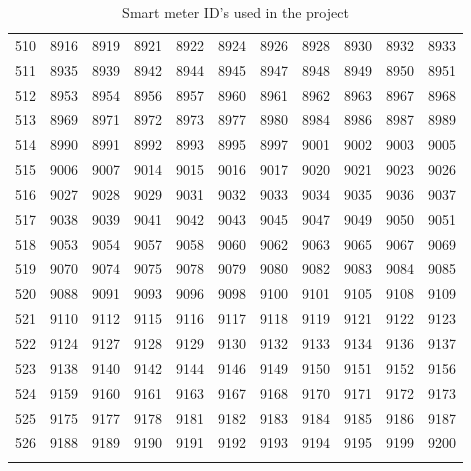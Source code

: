 \begin{longtable}{|r|rrrrrrrrrr|}
  510 & 8916 & 8919 & 8921 & 8922 & 8924 & 8926 & 8928 & 8930 & 8932 & 8933 \\ 
  511 & 8935 & 8939 & 8942 & 8944 & 8945 & 8947 & 8948 & 8949 & 8950 & 8951 \\ 
  512 & 8953 & 8954 & 8956 & 8957 & 8960 & 8961 & 8962 & 8963 & 8967 & 8968 \\ 
  513 & 8969 & 8971 & 8972 & 8973 & 8977 & 8980 & 8984 & 8986 & 8987 & 8989 \\ 
  514 & 8990 & 8991 & 8992 & 8993 & 8995 & 8997 & 9001 & 9002 & 9003 & 9005 \\ 
  515 & 9006 & 9007 & 9014 & 9015 & 9016 & 9017 & 9020 & 9021 & 9023 & 9026 \\ 
  516 & 9027 & 9028 & 9029 & 9031 & 9032 & 9033 & 9034 & 9035 & 9036 & 9037 \\ 
  517 & 9038 & 9039 & 9041 & 9042 & 9043 & 9045 & 9047 & 9049 & 9050 & 9051 \\ 
  518 & 9053 & 9054 & 9057 & 9058 & 9060 & 9062 & 9063 & 9065 & 9067 & 9069 \\ 
  519 & 9070 & 9074 & 9075 & 9078 & 9079 & 9080 & 9082 & 9083 & 9084 & 9085 \\ 
  520 & 9088 & 9091 & 9093 & 9096 & 9098 & 9100 & 9101 & 9105 & 9108 & 9109 \\ 
  521 & 9110 & 9112 & 9115 & 9116 & 9117 & 9118 & 9119 & 9121 & 9122 & 9123 \\ 
  522 & 9124 & 9127 & 9128 & 9129 & 9130 & 9132 & 9133 & 9134 & 9136 & 9137 \\ 
  523 & 9138 & 9140 & 9142 & 9144 & 9146 & 9149 & 9150 & 9151 & 9152 & 9156 \\ 
  524 & 9159 & 9160 & 9161 & 9163 & 9167 & 9168 & 9170 & 9171 & 9172 & 9173 \\ 
  525 & 9175 & 9177 & 9178 & 9181 & 9182 & 9183 & 9184 & 9185 & 9186 & 9187 \\ 
  526 & 9188 & 9189 & 9190 & 9191 & 9192 & 9193 & 9194 & 9195 & 9199 & 9200 \\ 
   \hline
\hline
\caption{Smart meter ID's used in the project} 
\label{tab:SMARTID}
\end{longtable}
